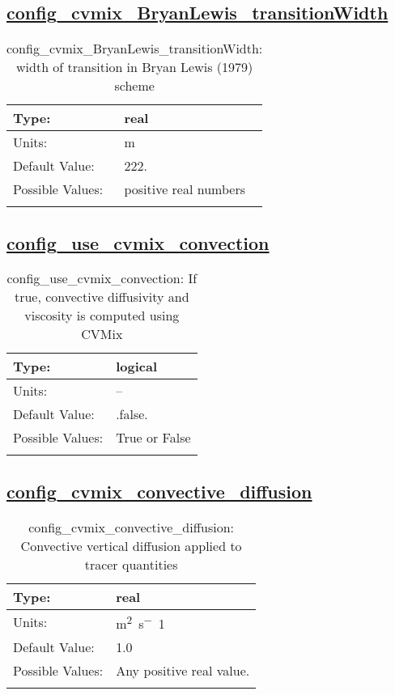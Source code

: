 \subsection[config\_cvmix\_BryanLewis\_transitionWidth]{\hyperref[sec:nm_tab_cvmix]{config\_cvmix\_BryanLewis\_transitionWidth}}
\label{subsec:nm_sec_config_cvmix_BryanLewis_transitionWidth}
\begin{center}
\begin{longtable}{| p{2.0in} || p{4.0in} |}
    \hline
    Type: & real \\
    \hline
    Units: & \si{m} \\
    \hline
    Default Value: & 222. \\
    \hline
    Possible Values: & positive real numbers \\
    \hline
    \caption{config\_cvmix\_BryanLewis\_transitionWidth: width of transition in Bryan Lewis (1979) scheme}
\end{longtable}
\end{center}
\subsection[config\_use\_cvmix\_convection]{\hyperref[sec:nm_tab_cvmix]{config\_use\_cvmix\_convection}}
\label{subsec:nm_sec_config_use_cvmix_convection}
\begin{center}
\begin{longtable}{| p{2.0in} || p{4.0in} |}
    \hline
    Type: & logical \\
    \hline
    Units: & -- \\
    \hline
    Default Value: & .false. \\
    \hline
    Possible Values: & True or False \\
    \hline
    \caption{config\_use\_cvmix\_convection: If true, convective diffusivity and viscosity is computed using CVMix}
\end{longtable}
\end{center}
\subsection[config\_cvmix\_convective\_diffusion]{\hyperref[sec:nm_tab_cvmix]{config\_cvmix\_convective\_diffusion}}
\label{subsec:nm_sec_config_cvmix_convective_diffusion}
\begin{center}
\begin{longtable}{| p{2.0in} || p{4.0in} |}
    \hline
    Type: & real \\
    \hline
    Units: & \si{m^2.s^-1} \\
    \hline
    Default Value: & 1.0 \\
    \hline
    Possible Values: & Any positive real value. \\
    \hline
    \caption{config\_cvmix\_convective\_diffusion: Convective vertical diffusion applied to tracer quantities}
\end{longtable}
\end{center}
